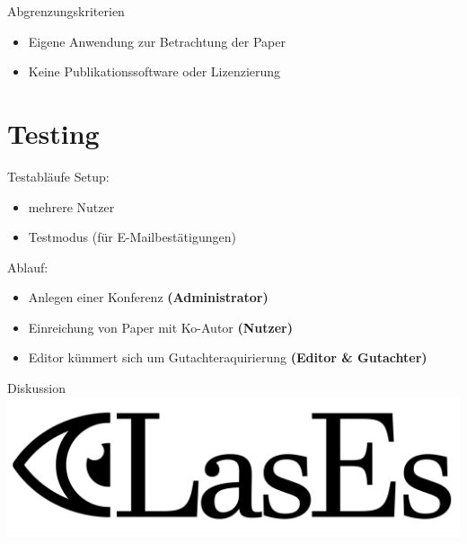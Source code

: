 \documentclass{beamer}
\begin{document}
    \begin{frame}{Abgrenzungskriterien}
        \pause
        \begin{itemize}
            \item Eigene Anwendung zur Betrachtung der Paper
            \pause
            \item Keine Publikationssoftware oder Lizenzierung
        \end{itemize}
    \end{frame}


    \section{Testing}
    \begin{frame}{Testabläufe}
        \pause
        Setup:
        \begin{itemize}
            \item mehrere Nutzer
            \item Testmodus (für E-Mailbestätigungen)
        \end{itemize}

        \pause

        Ablauf:
        \begin{itemize}
            \item Anlegen einer Konferenz \textbf{(Administrator)}
            \item Einreichung von Paper mit Ko-Autor \textbf{(Nutzer)}
            \item Editor kümmert sich um Gutachteraquirierung \textbf{(Editor \& Gutachter)}
        \end{itemize}
    \end{frame}

    \begin{frame}{Diskussion}
        \centering
        \includegraphics[width=0.7\linewidth]{../../docs/Pflichtenheft/graphics/LasEs-logo}
    \end{frame}
\end{document}
